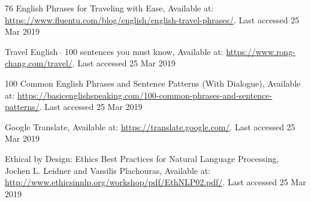 \documentclass[runningheads]{llncs}
\begin{document}
\begin{thebibliography}{8}
	76 English Phrases for Traveling with Ease, Available at: \url{https://www.fluentu.com/blog/english/english-travel-phrases/}.  Last accessed 25 Mar 2019

	Travel English-- 100 sentences you must know, Available at: \url{https://www.rong-chang.com/travel/}.  Last accessed 25 Mar 2019

	100 Common English Phrases and Sentence Patterns (With Dialogue), Available at: \url{https://basicenglishspeaking.com/100-common-phrases-and-sentence-patterns/}.  Last accessed 25 Mar 2019

	Google Translate, Available at: \url{https://translate.google.com/}.  Last accessed 25 Mar 2019

	Ethical by Design: Ethics Best Practices for Natural Language Processing, Jochen L. Leidner and Vassilis Plachouras, Available at: \url{http://www.ethicsinnlp.org/workshop/pdf/EthNLP02.pdf/}.  Last accessed 25 Mar 2019

\end{thebibliography}
	
\end{document}
